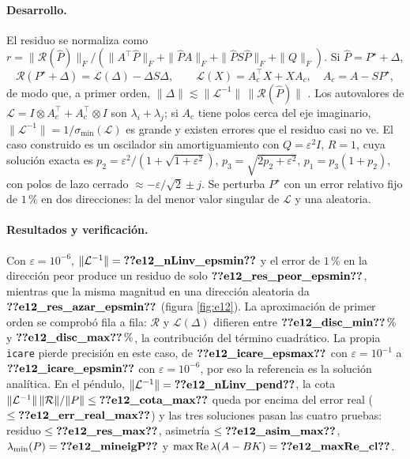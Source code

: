 \documentclass[11pt,a4paper]{article}
\begin{document}
\paragraph{Desarrollo.} El residuo se normaliza como
$r=\|\mathcal R(\hat P)\|_F/(\|A^\top\hat P\|_F+\|\hat PA\|_F+\|\hat PS\hat P\|_F+\|Q\|_F)$. Si $\hat P=P^\star+\Delta$,
\begin{equation}
\mathcal R(P^\star+\Delta)=\mathcal L(\Delta)-\Delta S\Delta,\qquad \mathcal L(X)=A_c^\top X+XA_c,\quad A_c=A-SP^\star ,
\end{equation}
de modo que, a primer orden, $\|\Delta\|\lesssim\|\mathcal L^{-1}\|\,\|\mathcal R(\hat P)\|$
\cite{kenney1990}. Los autovalores de $\mathcal L=I\otimes A_c^\top+A_c^\top\otimes I$ son $\lambda_i+\lambda_j$; si $A_c$ tiene
polos cerca del eje imaginario, $\|\mathcal L^{-1}\|=1/\sigma_{\min}(\mathcal L)$ es grande y existen errores que el
residuo casi no ve. El caso construido es un oscilador sin amortiguamiento con $Q=\varepsilon^2I$, $R=1$, cuya
solución exacta es $p_2=\varepsilon^2/(1+\sqrt{1+\varepsilon^2})$, $p_3=\sqrt{2p_2+\varepsilon^2}$, $p_1=p_3(1+p_2)$, con
polos de lazo cerrado $\approx-\varepsilon/\sqrt2\pm j$. Se perturba $P^\star$ con un error relativo fijo de $1\,\%$ en dos
direcciones: la del menor valor singular de $\mathcal L$ y una aleatoria.

\paragraph{Resultados y verificación.} Con $\varepsilon=10^{-6}$, $\|\mathcal L^{-1}\|=\V{e12_nLinv_epsmin}$ y el error de
$1\,\%$ en la dirección peor produce un residuo de solo $\V{e12_res_peor_epsmin}$, mientras que la misma magnitud
en una dirección aleatoria da $\V{e12_res_azar_epsmin}$ (figura \ref{fig:e12}). La aproximación de primer orden se
comprobó fila a fila: $\mathcal R$ y $\mathcal L(\Delta)$ difieren entre $\V{e12_disc_min}\,\%$ y $\V{e12_disc_max}\,\%$, la
contribución del término cuadrático. La propia \texttt{icare} pierde precisión en este caso, de $\V{e12_icare_epsmax}$
con $\varepsilon=10^{-1}$ a $\V{e12_icare_epsmin}$ con $\varepsilon=10^{-6}$, por eso la referencia es la solución analítica.
En el péndulo, $\|\mathcal L^{-1}\|=\V{e12_nLinv_pend}$, la cota $\|\mathcal L^{-1}\|\,\|\mathcal R\|/\|P\|\le\V{e12_cota_max}$ queda por
encima del error real ($\le\V{e12_err_real_max}$) y las tres soluciones pasan las cuatro pruebas: residuo
$\le\V{e12_res_max}$, asimetría $\le\V{e12_asim_max}$, $\lambda_{\min}(P)=\V{e12_mineigP}$ y
$\max\operatorname{Re}\lambda(A-BK)=\V{e12_maxRe_cl}$.
\end{document}
